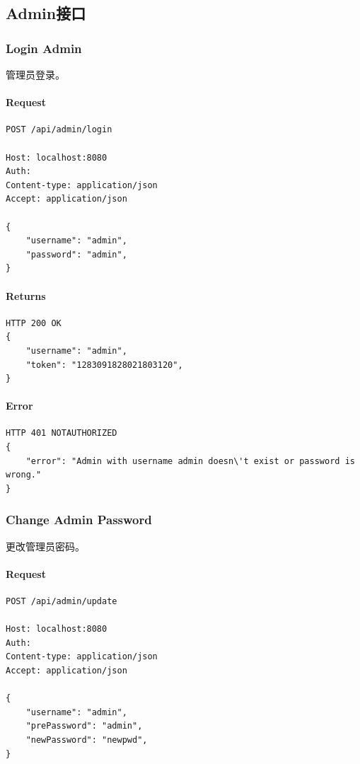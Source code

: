 \documentclass{article}
\begin{document}
		\subsection{Admin接口}

\subsubsection{Login Admin}
管理员登录。

\paragraph*{Request}
\begin{lstlisting}
POST /api/admin/login

Host: localhost:8080
Auth:
Content-type: application/json
Accept: application/json

{
    "username": "admin",
    "password": "admin",
}
\end{lstlisting}

\paragraph*{Returns}
\begin{lstlisting}
HTTP 200 OK
{
    "username": "admin",
    "token": "1283091828021803120",
}

\end{lstlisting}

\paragraph*{Error}
\begin{lstlisting}
HTTP 401 NOTAUTHORIZED
{
    "error": "Admin with username admin doesn\'t exist or password is wrong."
}
\end{lstlisting}

\subsubsection{Change Admin Password}
更改管理员密码。

\paragraph*{Request}
\begin{lstlisting}
POST /api/admin/update

Host: localhost:8080
Auth:
Content-type: application/json
Accept: application/json

{
    "username": "admin",
    "prePassword": "admin",
    "newPassword": "newpwd",
}
\end{lstlisting}
\end{document}

